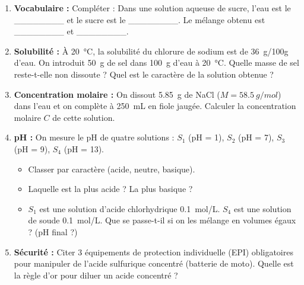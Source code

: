 \documentclass[11pt]{article}
\begin{document}
\begin{exercice}
\begin{enumerate}
\item \textbf{Vocabulaire :} Compléter : Dans une solution aqueuse de sucre, l'eau est le \_\_\_\_\_\_\_\_ et le sucre est le \_\_\_\_\_\_\_\_. Le mélange obtenu est \_\_\_\_\_\_\_\_ et \_\_\_\_\_\_\_\_.
\item \textbf{Solubilité :} À \SI{20}{\celsius}, la solubilité du chlorure de sodium est de \SI{36}{g/100g} d'eau. On introduit \SI{50}{g} de sel dans \SI{100}{g} d'eau à \SI{20}{\celsius}. Quelle masse de sel reste-t-elle non dissoute ? Quel est le caractère de la solution obtenue ?
\item \textbf{Concentration molaire :} On dissout \SI{5,85}{g} de NaCl ($M = \SI{58,5}{g/mol}$) dans l'eau et on complète à \SI{250}{mL} en fiole jaugée. Calculer la concentration molaire $C$ de cette solution.
\item \textbf{pH :} On mesure le pH de quatre solutions : $S_1$ (pH = 1), $S_2$ (pH = 7), $S_3$ (pH = 9), $S_4$ (pH = 13).
\begin{itemize}
\item[a)] Classer par caractère (acide, neutre, basique).
\item[b)] Laquelle est la plus acide ? La plus basique ?
\item[c)] $S_1$ est une solution d'acide chlorhydrique \SI{0,1}{mol/L}. $S_4$ est une solution de soude \SI{0,1}{mol/L}. Que se passe-t-il si on les mélange en volumes égaux ? (pH final ?)
\end{itemize}
\item \textbf{Sécurité :} Citer 3 équipements de protection individuelle (EPI) obligatoires pour manipuler de l'acide sulfurique concentré (batterie de moto). Quelle est la règle d'or pour diluer un acide concentré ?
\end{enumerate}
\end{exercice}
\end{document}
